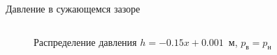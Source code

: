 \documentclass[ignoreonframetext,unicode]{beamer}
\begin{document}
\begin{frame}{Давление в сужающемся зазоре}
\begin{columns}
	\begin{figure}[!htbp]
		\caption{Распределение давления $h = -0.15 x + 0.001$~м, $p_{\text{в}} = p_{\text{н}}$}
		\label{zero_neg}
	\end{figure}
	\end{columns}
\end{frame}
\end{document}
